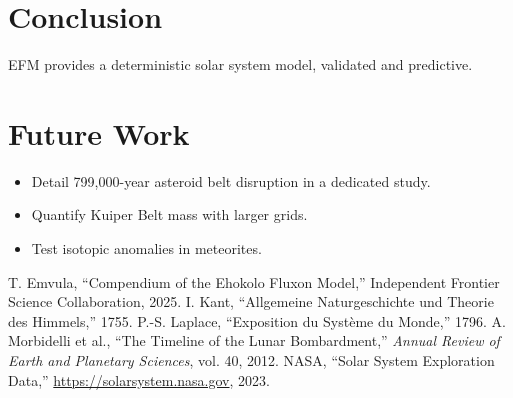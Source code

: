 \documentclass[11pt]{article}
\begin{document}
\section{Conclusion}
EFM provides a deterministic solar system model, validated and predictive.

\section{Future Work}
\begin{itemize}
    \item Detail 799,000-year asteroid belt disruption in a dedicated study.
    \item Quantify Kuiper Belt mass with larger grids.
    \item Test isotopic anomalies in meteorites.
\end{itemize}

\begin{thebibliography}{5}
\raggedright
{} T. Emvula, ``Compendium of the Ehokolo Fluxon Model,'' Independent Frontier Science Collaboration, 2025.
 I. Kant, ``Allgemeine Naturgeschichte und Theorie des Himmels,'' 1755.
 P.-S. Laplace, ``Exposition du Système du Monde,'' 1796.
 A. Morbidelli et al., ``The Timeline of the Lunar Bombardment,'' \textit{Annual Review of Earth and Planetary Sciences}, vol. 40, 2012.
 NASA, ``Solar System Exploration Data,'' \url{https://solarsystem.nasa.gov}, 2023.
\end{thebibliography}
\end{document}
